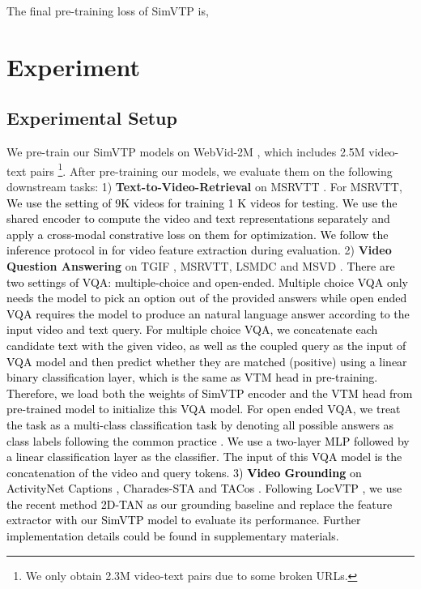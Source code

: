 \documentclass[10pt,twocolumn,letterpaper]{article}
\newcommand{\yty}[1]{\textcolor{black}{#1}}
\begin{document}
The final pre-training loss of SimVTP is,






\section{Experiment}
\label{sec:Exp}
\subsection{Experimental Setup}
We pre-train our SimVTP models on WebVid-2M \cite{bain2021frozen}, 
which includes 2.5M video-text pairs \footnote{We only obtain 2.3M video-text pairs due to some broken URLs.}.  
After pre-training our models, we evaluate them on the following downstream tasks:
1) \textbf{Text-to-Video-Retrieval} on MSRVTT \cite{xu2016msr}. 
For MSRVTT, 
\yty{We use the setting of 9K videos for training 1 K videos for testing.}
\yty{We use the shared encoder to compute the video and text representations separately and apply a cross-modal constrative loss on them for optimization. We follow the inference protocol in \cite{tong2022videomae} for video feature extraction during evaluation.}
2) \textbf{Video Question Answering} on TGIF \cite{li2016tgif}, MSRVTT\cite{xu2016msr}, LSMDC \cite{rohrbach2015dataset} and MSVD \cite{chen2011collecting}. \yty{There are two settings of VQA:  multiple-choice and open-ended. Multiple choice VQA only needs the model to pick an option out of the provided answers while open ended VQA requires the model to produce an natural language answer according to the input video and text query. 
For multiple choice VQA, we concatenate each candidate text with the given video, as well as the coupled query as the input of VQA model and then predict whether they are matched (positive) using a linear binary classification layer, which is the same as VTM head in pre-training.  Therefore, we load both the weights of SimVTP encoder and the VTM head from pre-trained model to initialize this VQA model.
For open ended VQA, we treat the task as a multi-class classification task by denoting all possible answers as class labels following the common practice \cite{lei2021less}. We use a two-layer MLP followed by a linear classification layer as the classifier. The input of this VQA model is the concatenation of the video and query tokens. 3) \textbf{Video Grounding} on ActivityNet Captions \cite{krishna2017dense}, Charades-STA \cite{gao2017tall} and TACos \cite{regneri2013grounding}. Following LocVTP \cite{cao2022locvtp}, we use the recent method 2D-TAN \cite{zhang2020learning} as our grounding baseline and replace the feature extractor with our SimVTP model to evaluate its performance. Further implementation details could be found in supplementary materials.}
\end{document}
